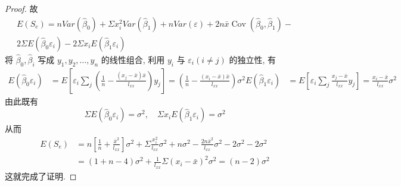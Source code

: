 \begin{proof}
    故
    \begin{equation*}
    \begin{array}{c}
    {E\left(S_{e}\right)=n Var\left(\hat{\beta}_{0}\right)+\Sigma x_{i}^{2} Var\left(\hat{\beta}_{1}\right)+n Var(\varepsilon)+2 n \bar{x} \operatorname{Cov}\left(\hat{\beta}_{0}, \hat{\beta}_{1}\right)-} \\ 
    {2 \Sigma E(\hat{\beta}_{0} \varepsilon_{i})-2 \Sigma x_{i} E(\hat{\beta}_{1} \varepsilon_{i})}\end{array}
    \end{equation*}
    将 $\hat{\beta}_0, \hat{\beta}_i$ 写成 $y_1, y_2, \ldots, y_n$ 的线性组合, 利用 $y_i$ 与 $\varepsilon_i(i \neq j)$ 的独立性, 有
    \begin{equation*}
    \begin{split}
        E(\hat{\beta}_{0} \varepsilon_{i})& =E\left[\varepsilon_{i} \sum_{j}\left(\frac{1}{n}-\frac{\left(x_{j}-\bar{x}\right) \bar{x}}{l_{x x}}\right) y_{j}\right]=\left(\frac{1}{n}-\frac{\left(x_{i}-\bar{x}\right) \bar{x}}{l_{x x}}\right) \sigma^{2}
        E(\hat{\beta}_{1} \varepsilon_{i}) &=E\left[\varepsilon_{i} \sum_{j} \frac{x_{j}-\bar{x}}{l_{x x}} y_{j}\right]=\frac{x_{i}-\bar{x}}{l_{x x}} \sigma^{2}
    \end{split}
    \end{equation*}
    由此既有
    \begin{equation*}
    \Sigma E\left(\hat{\beta}_{0} \varepsilon_{i}\right)=\sigma^{2}, \quad \Sigma x_{i} E\left(\hat{\beta}_{1} \varepsilon_{i}\right)=\sigma^{2}
    \end{equation*}
    从而
    \begin{equation*}
    \begin{aligned} E\left(S_{e}\right) &=n\left[\frac{1}{n}+\frac{\bar{x}^{2}}{l_{x x}}\right] \sigma^{2}+\Sigma \frac{x_{i}^{2}}{l_{x x}}\sigma^{2} + n \sigma^{2}-\frac{2 n \bar{x}^{2}}{l_{x x}} \sigma^{2}-2 \sigma^{2}-2 \sigma^{2} \\ &=(1+n-4) \sigma^{2}+\frac{1}{l_{x x}} \Sigma\left(x_{i}-\bar{x}\right)^{2} \sigma^{2}=(n-2) \sigma^{2} \end{aligned}
    \end{equation*}
    这就完成了证明.
\end{proof}

